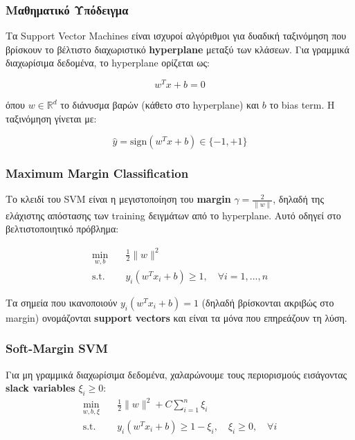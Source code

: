 \documentclass[12pt,a4paper,twoside]{book}
\begin{document}
\subsubsection{Μαθηματικό Υπόδειγμα}

Τα Support Vector Machines είναι ισχυροί αλγόριθμοι για δυαδική ταξινόμηση που βρίσκουν το βέλτιστο διαχωριστικό \textbf{hyperplane} μεταξύ των κλάσεων. Για γραμμικά διαχωρίσιμα δεδομένα, το hyperplane ορίζεται ως:

\begin{equation}
    w^T x + b = 0
\end{equation}

όπου \(w \in \mathbb{R}^d\) το διάνυσμα βαρών (κάθετο στο hyperplane) και \(b\) το bias term. Η ταξινόμηση γίνεται με:

\begin{equation}
    \hat{y} = \text{sign}(w^T x + b) \in \{-1, +1\}
\end{equation}

\subsubsection*{Maximum Margin Classification}

Το κλειδί του SVM είναι η μεγιστοποίηση του \textbf{margin} \(\gamma = \frac{2}{\|w\|}\), δηλαδή της ελάχιστης απόστασης των training δειγμάτων από το hyperplane. Αυτό οδηγεί στο βελτιστοποιητικό πρόβλημα:

\begin{equation}
    \begin{aligned}
        \min_{w, b} \quad & \frac{1}{2} \|w\|^2                                  \\
        \text{s.t.} \quad & y_i(w^T x_i + b) \geq 1, \quad \forall i = 1, ..., n
    \end{aligned}
\end{equation}

Τα σημεία που ικανοποιούν \(y_i(w^T x_i + b) = 1\) (δηλαδή βρίσκονται ακριβώς στο margin) ονομάζονται \textbf{support vectors} και είναι τα μόνα που επηρεάζουν τη λύση.

\subsubsection*{Soft-Margin SVM}

Για μη γραμμικά διαχωρίσιμα δεδομένα, χαλαρώνουμε τους περιορισμούς εισάγοντας \textbf{slack variables} \(\xi_i \geq 0\):
\begin{equation}
    \begin{aligned}
        \min_{w, b, \xi} \quad & \frac{1}{2} \|w\|^2 + C \sum_{i=1}^{n} \xi_i                         \\
        \text{s.t.} \quad      & y_i(w^T x_i + b) \geq 1 - \xi_i, \quad \xi_i \geq 0, \quad \forall i
    \end{aligned}
\end{equation}
\end{document}
